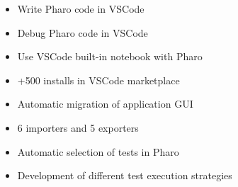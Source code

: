 \documentclass[10pt,a4paper,ragged2e,withhyper]{altacv}
\begin{document}
\begin{paracol}{2}


\begin{itemize}
  \item Write Pharo code in VSCode
  \item Debug Pharo code in VSCode
  \item Use VSCode built-in notebook with Pharo
  \item +500 installs in VSCode marketplace
\end{itemize}

\divider



\begin{itemize}
  \item Automatic migration of application GUI
  \item 6 importers and 5 exporters
\end{itemize}

\divider

\begin{itemize}
  \item Automatic selection of tests in Pharo
  \item Development of different test execution strategies
\end{itemize}






\nocite{*}




\end{paracol}
\end{document}
